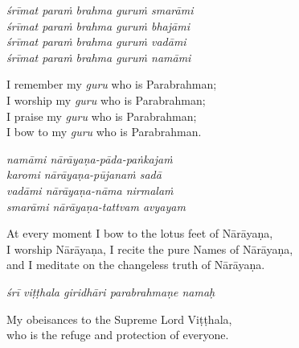 \documentclass[12pt, twoside, openright]{memoir}
\begin{document}
\begin{center}
    {\large\itshape
    śrīmat paraṁ brahma guruṁ smarāmi \\
    śrīmat paraṁ brahma guruṁ bhajāmi \\
    śrīmat paraṁ brahma guruṁ vadāmi \\
    śrīmat paraṁ brahma guruṁ namāmi \par
    }

    \vspace{1em}

    \small
    I remember my \textit{guru} who is Parabrahman; \\
    I worship my \textit{guru} who is Parabrahman; \\
    I praise my \textit{guru} who is Parabrahman; \\
    I bow to my \textit{guru} who is Parabrahman.

    \vspace{2em}

    {\large\itshape
    namāmi nārāyaṇa-pāda-paṅkajaṁ \\
    karomi nārāyaṇa-pūjanaṁ sadā \\
    vadāmi nārāyaṇa-nāma nirmalaṁ \\
    smarāmi nārāyaṇa-tattvam avyayam \par
    }

    \vspace{1em}

    \small
    At every moment I bow to the lotus feet of Nārāyaṇa, \\
    I worship Nārāyaṇa, I recite the pure Names of Nārāyaṇa, \\
    and I meditate on the changeless truth of Nārāyaṇa.

    \vspace{2.5em}

    {\large\itshape
    śrī viṭṭhala giridhāri parabrahmaṇe namaḥ \par
    }

    \vspace{1em}

    \small
    My obeisances to the Supreme Lord Viṭṭhala, \\
    who is the refuge and protection of everyone.
\end{center}

\newpage \chapter{}
\end{document}
